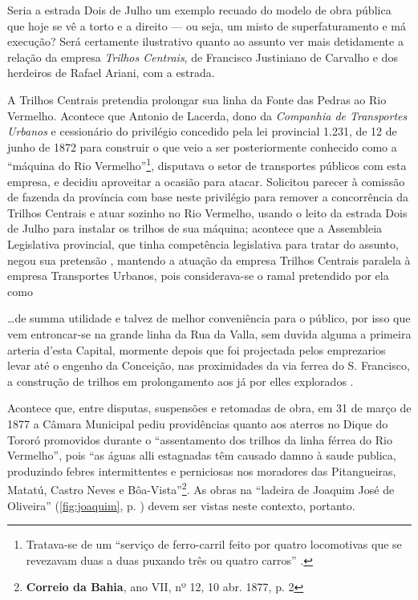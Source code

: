 Seria a estrada Dois de Julho um exemplo recuado do modelo de obra pública que hoje se vê a torto e a direito --- ou seja, um misto de superfaturamento e má execução? Será certamente ilustrativo quanto ao assunto ver mais detidamente a relação da empresa \textit{Trilhos Centrais}, de Francisco Justiniano de Carvalho e dos herdeiros de Rafael Ariani, com a estrada.

A Trilhos Centrais pretendia prolongar sua linha da Fonte das Pedras ao Rio Vermelho. Acontece que Antonio de Lacerda, dono da \textit{Companhia de Transportes Urbanos} e cessionário do privilégio concedido pela lei provincial 1.231, de 12 de junho de 1872 para construir o que veio a ser posteriormente conhecido como a ``máquina do Rio Vermelho''\footnote{Tratava-se de um ``serviço de ferro-carril feito por quatro locomotivas que se revezavam duas a duas puxando três ou quatro carros'' \cite[p.~90]{trinchao_parafuso_2010}.}, disputava o setor de transportes públicos com esta empresa, e decidiu aproveitar a ocasião para atacar. Solicitou parecer à comissão de fazenda da província com base neste privilégio para remover a concorrência da Trilhos Centrais e atuar sozinho no Rio Vermelho, usando o leito da estrada Dois de Julho para instalar os trilhos de sua máquina; acontece que a Assembleia Legislativa provincial, que tinha competência legislativa para tratar do assunto, negou sua pretensão \cite[p.~250]{bahia_relatassleg_1875}, mantendo a atuação da empresa Trilhos Centrais paralela à empresa Transportes Urbanos, pois considerava-se o ramal pretendido por ela como

\begin{citacao}
\dots de summa utilidade e talvez de melhor conveniência para o público, por isso que vem entroncar-se na grande linha da Rua da Valla, sem duvida alguma a primeira arteria d'esta Capital, mormente depois que foi projectada pelos emprezarios levar até o engenho da Conceição, nas proximidades da via ferrea do S. Francisco, a construção de trilhos em prolongamento aos já por elles explorados \cite[p.~169]{bahia_rpe_1874}.
\end{citacao}

Acontece que, entre disputas, suspensões e retomadas de obra, em 31 de março de 1877 a Câmara Municipal pediu providências quanto aos aterros no Dique do Tororó promovidos durante o ``assentamento dos trilhos da linha férrea do Rio Vermelho'', pois ``as águas alli estagnadas têm causado damno à saude publica, produzindo febres intermittentes e perniciosas nos moradores das Pitangueiras, Matatú, Castro Neves e Bôa-Vista''\footnote{\textbf{Correio da Bahia}, ano VII, nº 12, 10 abr. 1877, p. 2}. As obras na ``ladeira de Joaquim José de Oliveira'' (\autoref{fig:joaquim}, p. \pageref{fig:joaquim}) devem ser vistas neste contexto, portanto. 

